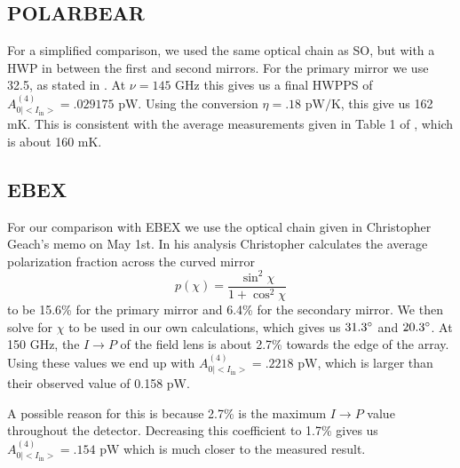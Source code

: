 \documentclass{article}
\theoremstyle{remark}
\newcommand{\tab}{\hspace*{2em}}
\renewcommand{\t}[1]{\text{#1}}
\newcommand{\AI}{A^{(4)}_{0|<I_{\t{in}}>}}
\newcommand{\ip}{$I\rightarrow P$ }
\begin{document}
\subsection*{POLARBEAR}
\tab For a simplified comparison, we used the same optical chain as SO, but with a HWP in between the first and second mirrors.
For the primary mirror we use 32.5\degree, as stated in \cite{takakura_performance_2017}. At $\nu = 145 \t{ GHz}$ this gives us a final 
HWPPS of $\AI = .029175 \t{ pW}$. Using the conversion $\eta = .18 \t{ pW/K}$, this give us 162 mK.
This is consistent with the average measurements given in Table 1 of \cite{takakura_performance_2017}, which is about 160 mK.

\subsection*{EBEX}

\tab For our comparison with EBEX we use the optical chain given in Christopher Geach's memo on May 1st.
In his analysis Christopher calculates the average polarization fraction across the curved mirror
\[p(\chi) = \frac{\sin^2 \chi}{1 + \cos^2 \chi}\]
to be 15.6\% for the primary mirror and 6.4\% for the secondary mirror. 
We then solve for $\chi$ to be used in our own calculations, which gives us $31.3\degree$ and $20.3 \degree$.
At 150 GHz, the \ip of the field lens is about 2.7\% towards the edge of the array.
Using these values we end up with $\AI = .2218 \t{ pW}$, which is larger than their observed value of 0.158 pW.

\tab A possible reason for this is because 2.7\% is the maximum \ip value throughout the detector. 
Decreasing this coefficient to 1.7\% gives us $\AI = .154 \t{ pW}$ which is much closer to the measured result.





\printbibliography
\end{document}

